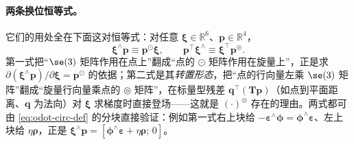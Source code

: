 \paragraph{两条换位恒等式。}它们的用处全在下面这对恒等式：对任意 $\boldsymbol{\xi}\in\mathbb{R}^6$、$\mathbf{p}\in\mathbb{R}^4$，
\begin{equation}
  \boldsymbol{\xi}^\wedge\mathbf{p}\equiv\mathbf{p}^{\odot}\boldsymbol{\xi},
  \qquad
  \mathbf{p}^\top\boldsymbol{\xi}^\wedge\equiv\boldsymbol{\xi}^\top\mathbf{p}^{\circledcirc}.
  \label{eq:odot-identities}
\end{equation}
第一式把“$\se(3)$ 矩阵作用在点上”翻成“点的 $\odot$ 矩阵作用在旋量上”，正是求 $\partial(\boldsymbol{\xi}^\wedge\mathbf{p})/\partial\boldsymbol{\xi}=\mathbf{p}^\odot$ 的依据；第二式是其\emph{转置形态}，把“点的行向量左乘 $\se(3)$ 矩阵”翻成“旋量行向量乘点的 $\circledcirc$ 矩阵”，在标量型残差 $\mathbf{q}^\top(\mathbf{T}\mathbf{p})$（如点到平面距离、$\mathbf{q}$ 为法向）对 $\boldsymbol{\xi}$ 求梯度时直接登场——这就是 $(\cdot)^\circledcirc$ 存在的理由。两式都可由 \cref{eq:odot-circ-def} 的分块直接验证：例如第一式右上块给 $-\boldsymbol{\varepsilon}^\wedge\boldsymbol{\phi}=\boldsymbol{\phi}^\wedge\boldsymbol{\varepsilon}$、左上块给 $\eta\boldsymbol{\rho}$，正是 $\boldsymbol{\xi}^\wedge\mathbf{p}=[\boldsymbol{\phi}^\wedge\boldsymbol{\varepsilon}+\eta\boldsymbol{\rho};\,0]$。

